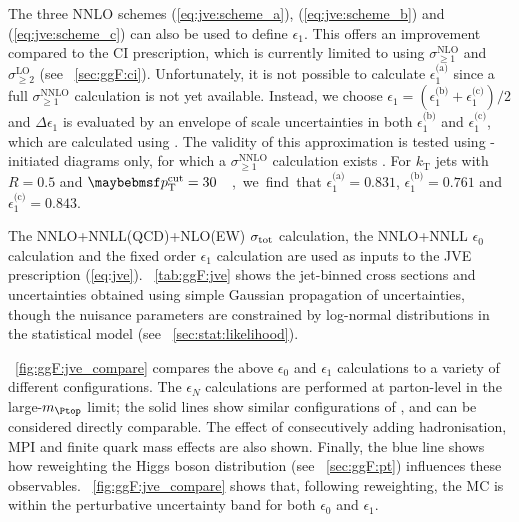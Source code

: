 The three NNLO schemes (\ref{eq:jve:scheme_a}), (\ref{eq:jve:scheme_b}) and 
(\ref{eq:jve:scheme_c}) can also be used to define $\epsilon_1$. This offers an improvement 
compared to the CI prescription, which is currently limited to using 
$\sigma_{\geq1}^{\text{NLO}}$ and $\sigma_{\geq2}^{\text{LO}}$ (see 
\Section~\ref{sec:ggF:ci}). Unfortunately, it is not possible to calculate 
$\epsilon_1^{\text{(a)}}$ since a full $\sigma_{\geq1}^{\text{NNLO}}$ calculation is not 
yet available. Instead, we choose $\epsilon_1 = (\epsilon_1^{\text{(b)}} + 
\epsilon_1^{\text{(c)}})/2$ and $\Delta\epsilon_1$ is evaluated by an envelope of scale 
uncertainties in both $\epsilon_1^{\text{(b)}}$ and $\epsilon_1^{\text{(c)}}$, which are 
calculated using \mcfm \cite{MCFM:H2j}.
The validity of this approximation is tested using \HepProcess{\Pgluon\Pgluon}-initiated 
diagrams only, for which a $\sigma_{\geq1}^{\text{NNLO}}$ calculation exists 
\cite{H+1j:NNLO}. For $k_{\text{T}}$ jets with $R = 0.5$ and \unit{$\ptcut = 30$}{\GeV}, we 
find that $\epsilon_1^{\text{(a)}} = 0.831$, $\epsilon_1^{\text{(b)}} = 0.761$ and 
$\epsilon_1^{\text{(c)}} = 0.843$.

The NNLO+NNLL(QCD)+NLO(EW) $\sigma_{\text{tot}}$ calculation, the \jetvheto NNLO+NNLL 
$\epsilon_0$ calculation and the \mcfm fixed order $\epsilon_1$ calculation are used as inputs to the JVE 
prescription (\ref{eq:jve}). \Table~\ref{tab:ggF:jve} shows the jet-binned cross sections 
and uncertainties obtained using simple Gaussian propagation of uncertainties, though the 
nuisance parameters are constrained by log-normal distributions in the statistical model 
(see \Section~\ref{sec:stat:likelihood}).

\Figure~\ref{fig:ggF:jve_compare} compares the above $\epsilon_0$ and $\epsilon_1$ 
calculations to a variety of different  configurations.
The $\epsilon_N$ calculations are performed at parton-level in the large-$m_{\Ptop}$ 
limit; the solid lines show similar configurations of , 
and can be considered directly comparable. The effect of consecutively adding 
hadronisation, MPI and finite quark mass effects are also shown. Finally, the blue line 
shows how reweighting the Higgs boson \pt distribution (see \Section~\ref{sec:ggF:pt}) 
influences these observables. \Figure~\ref{fig:ggF:jve_compare} shows that, following 
\ptH reweighting, the MC is within the perturbative uncertainty band for both $\epsilon_0$ 
and $\epsilon_1$.

